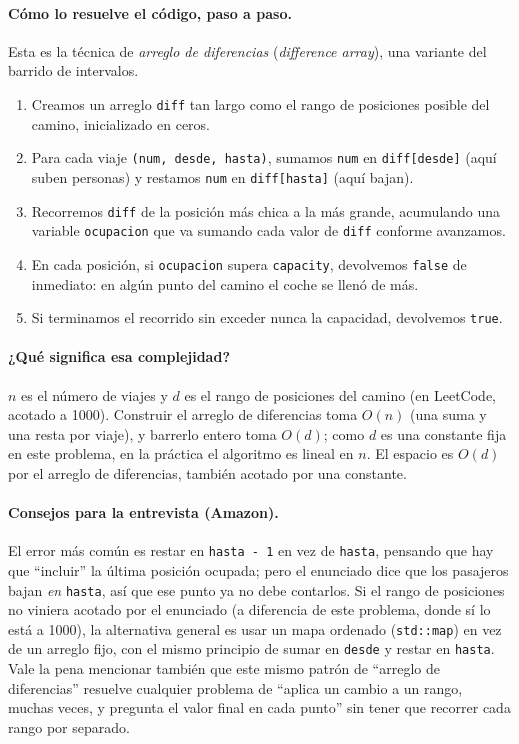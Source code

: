 \paragraph{Cómo lo resuelve el código, paso a paso.} Esta es la técnica de
\emph{arreglo de diferencias} (\emph{difference array}), una variante del
barrido de intervalos.
\begin{enumerate}
  \item Creamos un arreglo \texttt{diff} tan largo como el rango de
        posiciones posible del camino, inicializado en ceros.
  \item Para cada viaje \texttt{(num, desde, hasta)}, sumamos \texttt{num} en
        \texttt{diff[desde]} (aquí suben personas) y restamos \texttt{num}
        en \texttt{diff[hasta]} (aquí bajan).
  \item Recorremos \texttt{diff} de la posición más chica a la más grande,
        acumulando una variable \texttt{ocupacion} que va sumando cada
        valor de \texttt{diff} conforme avanzamos.
  \item En cada posición, si \texttt{ocupacion} supera \texttt{capacity},
        devolvemos \texttt{false} de inmediato: en algún punto del camino el
        coche se llenó de más.
  \item Si terminamos el recorrido sin exceder nunca la capacidad,
        devolvemos \texttt{true}.
\end{enumerate}




\paragraph{¿Qué significa esa complejidad?} $n$ es el número de viajes y
$d$ es el rango de posiciones del camino (en LeetCode, acotado a 1000).
Construir el arreglo de diferencias toma $O(n)$ (una suma y una resta por
viaje), y barrerlo entero toma $O(d)$; como $d$ es una constante fija en
este problema, en la práctica el algoritmo es lineal en $n$. El espacio es
$O(d)$ por el arreglo de diferencias, también acotado por una constante.

\paragraph{Consejos para la entrevista (Amazon).} El error más común es
restar en \texttt{hasta - 1} en vez de \texttt{hasta}, pensando que hay que
``incluir'' la última posición ocupada; pero el enunciado dice que los
pasajeros bajan \emph{en} \texttt{hasta}, así que ese punto ya no debe
contarlos. Si el rango de posiciones no viniera acotado por el enunciado
(a diferencia de este problema, donde sí lo está a 1000), la alternativa
general es usar un mapa ordenado (\texttt{std::map}) en vez de un arreglo
fijo, con el mismo principio de sumar en \texttt{desde} y restar en
\texttt{hasta}. Vale la pena mencionar también que este mismo patrón de
``arreglo de diferencias'' resuelve cualquier problema de ``aplica un
cambio a un rango, muchas veces, y pregunta el valor final en cada punto''
sin tener que recorrer cada rango por separado.
